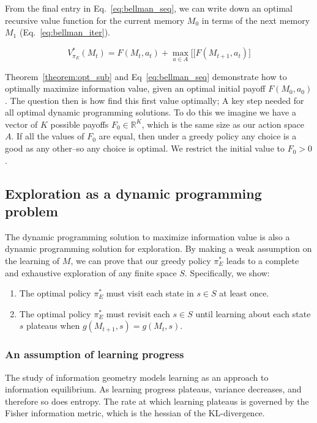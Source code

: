 \documentclass[9pt,twocolumn,twoside]{pnas-new}
\begin{document}
From the final entry in Eq.~\ref{eq:bellman_seq}, we can write down an optimal recursive value function for the current memory $M_0$ in terms of the next memory $M_1$ (Eq.~\ref{eq:bellman_iter}).

\begin{equation} \label{eq:bellman_iter}
    V^*_{\pi_E}(M_{t}) = F(M_{t}, a_{t}) + \max_{a \in A} \Big [ [F(M_{t+1}, a_t) \Big ]
\end{equation}
    
Theorem~\ref{theorem:opt_sub} and Eq~\ref{eq:bellman_seq} demonstrate how to optimally maximize information value, given an optimal initial payoff $F(M_0, a_0)$. The question then is how find this first value optimally; A key step needed for all optimal dynamic programming solutions. To do this we imagine we have a vector of $K$ possible payoffs $F_0 \in \mathbb{R}^K$, which is the same size as our action space $A$. If all the values of $F_0$ are equal, then under a greedy policy any choice is a good as any other--so any choice is optimal. We restrict the initial value to $F_0 > 0$.  %

\subsection*{Exploration as a dynamic programming problem}
The dynamic programming solution to maximize information value is also a dynamic programming solution for exploration. By making a weak assumption on the learning of $M$, we can prove that our greedy policy $\pi^*_E$ leads to a complete and exhaustive exploration of any finite space $S$. Specifically, we show:

\begin{enumerate}[noitemsep,wide=0pt,leftmargin=\dimexpr\labelwidth+2\labelsep\relax]
    \item The optimal policy $\pi^*_E$ must visit each state in $s \in S$ at least once.
    \item The optimal policy $\pi^*_E$ must revisit each $s \in S$ until learning about each state $s$ plateaus when $g(M_{t+1}, s) = g(M_{t},s)$.
\end{enumerate}


\subsubsection*{An assumption of learning progress}
The study of information geometry models learning as an approach to information equilibrium. As learning progress plateaus, variance decreases, and therefore so does entropy. The rate at which learning plateaus is governed by the Fisher information metric, which is the hessian of the KL-divergence.
\end{document}
